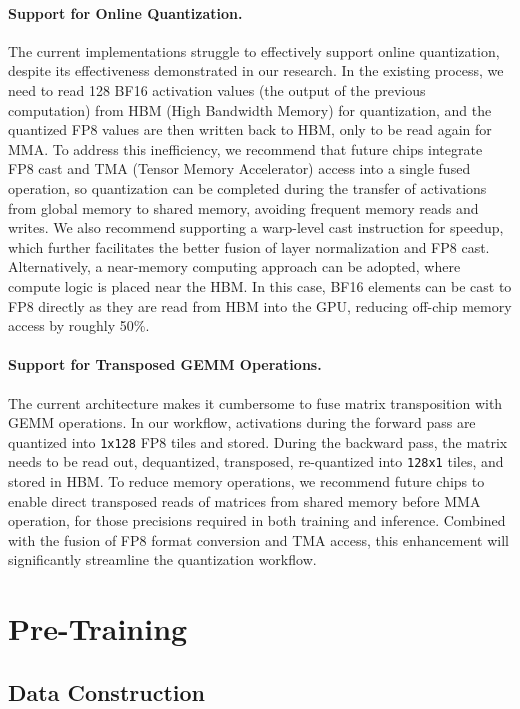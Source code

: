 \documentclass[11pt, a4paper, logo, copyright, nonumbering]{deepseek}
\begin{document}
\begin{CJK*}{UTF8}{gbsn}
\paragraph{Support for Online Quantization.}
The current implementations struggle to effectively support online quantization, despite its effectiveness demonstrated in our research. 
In the existing process, we need to read 128 BF16 activation values (the output of the previous computation) from HBM (High Bandwidth Memory) for quantization, and the quantized FP8 values are then written back to HBM, only to be read again for MMA. 
To address this inefficiency, we recommend that future chips integrate FP8 cast and TMA (Tensor Memory Accelerator) access into a single fused operation, so quantization can be completed during the transfer of activations from global memory to shared memory, avoiding frequent memory reads and writes. 
We also recommend supporting a warp-level cast instruction for speedup, which further facilitates the better fusion of layer normalization and FP8 cast.
Alternatively, a near-memory computing approach can be adopted, where compute logic is placed near the HBM. 
In this case, BF16 elements can be cast to FP8 directly as they are read from HBM into the GPU, reducing off-chip memory access by roughly 50\%. 

\paragraph{Support for Transposed GEMM Operations.}
The current architecture makes it cumbersome to fuse matrix transposition with GEMM operations. 
In our workflow, activations during the forward pass are quantized into \texttt{1x128} FP8 tiles and stored. 
During the backward pass, the matrix needs to be read out, dequantized, transposed, re-quantized into \texttt{128x1} tiles, and stored in HBM. 
To reduce memory operations, we recommend future chips to enable direct transposed reads of matrices from shared memory before MMA operation, for those precisions required in both training and inference. Combined with the fusion of FP8 format conversion and TMA access, this enhancement will significantly streamline the quantization workflow.

\section{Pre-Training}
\label{sec:pre-training}

\subsection{Data Construction}


\end{CJK*}
\end{document}

